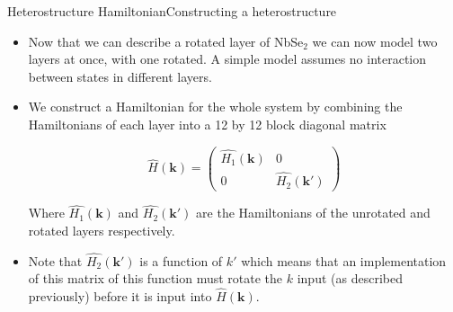 \documentclass[9pt]{beamer}
\begin{document}
\begin{frame}{Heterostructure Hamiltonian}{Constructing a heterostructure}
  \begin{itemize}
    \item Now that we can describe a rotated layer of NbSe$_2$ we can now model two layers at once, with one rotated. A simple model assumes no interaction between states in different layers. 
    \item{We construct a Hamiltonian for the whole system by combining the Hamiltonians of each layer into a 12 by 12 block diagonal matrix

      \begin{equation}
        \hat{H}(\boldsymbol{k})=\left(\begin{array}{cc}
          \hat{H_1}(\boldsymbol{k}) & 0\\
          0 & \hat{H_2}(\boldsymbol{k'})
        \end{array}\right)
      \end{equation}
      
      Where $\hat{H_1}(\boldsymbol{k})$ and $\hat{H_2}(\boldsymbol{k'})$ are the Hamiltonians of the unrotated and rotated layers respectively.
      }
    \item Note that $\hat{H_2}(\boldsymbol{k'})$ is a function of $k'$ which means that an implementation of this matrix of this function must rotate the $k$ input (as described previously) before it is input into $\hat{H}(\boldsymbol{k})$.
  \end{itemize}
\end{frame}
\end{document}
